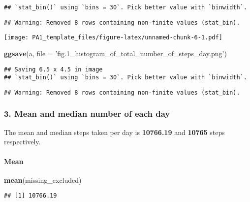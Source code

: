 \documentclass[]{article}
\newenvironment{Shaded}{\begin{snugshade}}{\end{snugshade}}
\newcommand{\DataTypeTok}[1]{\textcolor[rgb]{0.13,0.29,0.53}{#1}}
\newcommand{\KeywordTok}[1]{\textcolor[rgb]{0.13,0.29,0.53}{\textbf{#1}}}
\newcommand{\NormalTok}[1]{#1}
\newcommand{\StringTok}[1]{\textcolor[rgb]{0.31,0.60,0.02}{#1}}
\let\oldparagraph\paragraph
\renewcommand{\paragraph}[1]{\oldparagraph{#1}\mbox{}}
\begin{document}
\begin{verbatim}
## `stat_bin()` using `bins = 30`. Pick better value with `binwidth`.
\end{verbatim}

\begin{verbatim}
## Warning: Removed 8 rows containing non-finite values (stat_bin).
\end{verbatim}

\texttt{[image: PA1\_template\_files/figure-latex/unnamed-chunk-6-1.pdf]}

\begin{Shaded}
\begin{Highlighting}[]
\KeywordTok{ggsave}\NormalTok{(a, }\DataTypeTok{file =} \StringTok{'fig.1_histogram_of_total_number_of_steps_day.png'}\NormalTok{)}
\end{Highlighting}
\end{Shaded}

\begin{verbatim}
## Saving 6.5 x 4.5 in image
## `stat_bin()` using `bins = 30`. Pick better value with `binwidth`.
\end{verbatim}

\begin{verbatim}
## Warning: Removed 8 rows containing non-finite values (stat_bin).
\end{verbatim}

\hypertarget{mean-and-median-number-of-each-day}{%
\subsubsection{3. Mean and median number of each
day}\label{mean-and-median-number-of-each-day}}

The mean and median steps taken per day is \textbf{10766.19} and
\textbf{10765} steps respectively.

\hypertarget{mean}{%
\paragraph{Mean}\label{mean}}

\begin{Shaded}
\begin{Highlighting}[]
\KeywordTok{mean}\NormalTok{(missing_excluded)}
\end{Highlighting}
\end{Shaded}

\begin{verbatim}
## [1] 10766.19
\end{verbatim}
\end{document}
